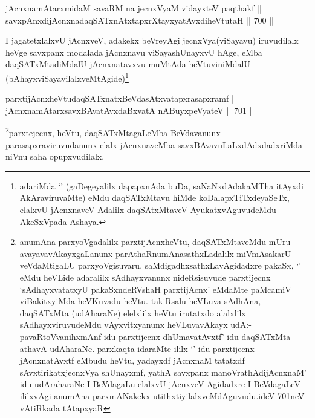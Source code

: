 
\begin{shl}
jAcnxnamAtarxmidaM savaRM na jecnxVyaM vidayxteV paqthakf || \\
savxpAnxdijAcnxnadaqSATxnAtxtapxrXtayxyatAvxdiheVtutaH ||  700 ||  
\end{shl}

\begin{artha}
I jagatetxlalxvU jAcnxveV, adakekx beVreyAgi jecnxVya(viSayavu) iruvudilalx heVge savxpanx modalada jAcnxnavu viSayashUnayxvU hAge, eMba daqSATxMtadiMdalU jAcnxnatavxvu muMtAda heVtuviniMdalU (bAhayxviSayavilalxveMtAgide)\footnote{adariMda `\stext' (gaDegeyalilx dapapxnAda buDa, saNaNxdAdakaMTha itAyxdi AkAraviruvaMte) eMdu daqSATxMtavu hiMde koDalapxTiTxdeyaSeTx, elalxvU jAcnxnaveV Adalilx daqSAtxMtaveV AyukatxvAguvudeMdu AkeSxVpada Ashaya.}
\end{artha}


\begin{shl}
parxtijAcnxheVtudaqSATxnatxBeVdasAtxvatapxrasapxramf || \\
jAcnxnamAtarxsavxBAvatAvxdaBxvatA nABuyxpeVyateV ||  701 ||  
\end{shl}

\begin{artha}
\footnote{anumAna parxyoVgadalilx parxtijAcnxheVtu, daqSATxMtaveMdu mUru avayavavAkayxgaLanunx parAthaRnumAnasathxLadalilx miVmAsakarU veVdaMtigaLU parxyoVgisuvaru. saMdigadhxsathxLavAgidadxre pakaSx, `\stext' eMdu heVLide adaralilx sAdhayxvanunx nideRsisuvude parxtijecnx `sAdhayxvatatxyU pakaSxndeRVshaH parxtijAcnx' eMdaMte paMcamiV viBakitxyiMda heVKuvadu heVtu. takiRsalu heVLuva sAdhAna, daqSATxMta (udAharaNe) elelxlilx heVtu irutatxdo alalxlilx sAdhayxviruvudeMdu vAyxvitxyanunx heVLuvavAkayx udA:-pavaRtoVvanihxmAnf idu parxtijecnx dhUmavatAvxtf' idu daqSATxMta athavA udAharaNe. parxkaqta idaraMte ililx `\stext' idu parxtijecnx jAcnxnatAvxtf eMbudu heVtu, yadayxdf jAcnxnaM tatatxdf sAvxtirikatxjecnxVya shUnayxmf, yathA savxpanx manoVrathAdijAcnxnaM' idu udAraharaNe I BeVdagaLu elalxvU jAcnxveV Agidadxre I BeVdagaLeV ililxvAgi anumAna parxmANakekx utithxtiyilalxveMdAguvudu.ideV 701neV vAtiRkada tAtapxyaR}parxtejecnx, heVtu, daqSATxMtagaLeMba BeVdavanunx parasapxraviruvudanunx elalx jAcnxnaveMba savxBAvavuLaLxdAdxdadxriMda niVnu saha opupxvudilalx.
\end{artha}

